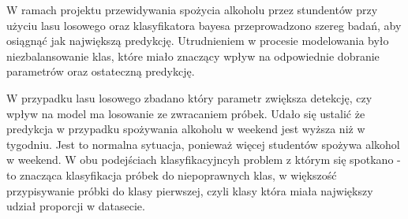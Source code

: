 W ramach projektu przewidywania spożycia alkoholu przez stundentów przy użyciu lasu losowego oraz klasyfikatora bayesa przeprowadzono szereg badań, aby osiągnąć jak największą predykcję. Utrudnieniem w procesie modelowania było niezbalansowanie klas, które miało znaczący wpływ na odpowiednie dobranie parametrów oraz ostateczną predykcję.

W przypadku lasu losowego zbadano który parametr zwiększa detekcję, czy wpływ na model ma losowanie ze zwracaniem próbek. Udało się ustalić że predykcja w przypadku spożywania alkoholu w weekend jest wyższa niż w tygodniu. Jest to normalna sytuacja, ponieważ więcej studentów spożywa alkohol w weekend.
W obu podejściach klasyfikacyjncyh problem z którym się spotkano - to znacząca klasyfikacja próbek do niepoprawnych klas, w większość przypisywanie próbki do klasy pierwszej, czyli klasy która miała największy udział proporcji w datasecie.
